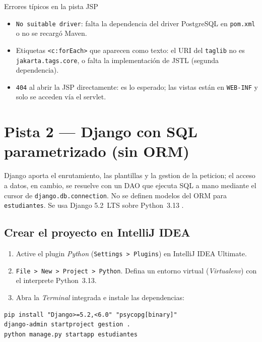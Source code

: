 \documentclass[11pt,a4paper,openany]{book}
\begin{document}
\begin{cajaadvertencia}{Errores típicos en la pista JSP}
\begin{itemize}
\item \texttt{No suitable driver}: falta la dependencia del driver
PostgreSQL en \texttt{pom.xml} o no se recargó Maven.
\item Etiquetas \texttt{<c:forEach>} que aparecen como texto: el URI del
\texttt{taglib} no es \texttt{jakarta.tags.core}, o falta la
implementación de JSTL (segunda dependencia).
\item \texttt{404} al abrir la JSP directamente: es lo esperado; las
vistas están en \texttt{WEB-INF} y solo se acceden vía el servlet.
\end{itemize}
\end{cajaadvertencia}

\section{Pista 2 --- Django con SQL parametrizado (sin ORM)}
\label{ap:crud:django}

Django aporta el enrutamiento, las plantillas y la gestion de la
peticion; el acceso a datos, en cambio, se resuelve con un DAO que
ejecuta SQL a mano mediante el cursor de \texttt{django.db.connection}.
No se definen modelos del ORM para \texttt{estudiantes}. Se usa Django
5.2~LTS sobre Python~3.13 \cite{django52docs}.

\subsection{Crear el proyecto en IntelliJ IDEA}
\label{ap:crud:django:crear}

\begin{enumerate}
\item Active el plugin \emph{Python} (\texttt{Settings > Plugins}) en
IntelliJ IDEA Ultimate.
\item \texttt{File > New > Project > Python}. Defina un entorno virtual
(\emph{Virtualenv}) con el interprete Python~3.13.
\item Abra la \emph{Terminal} integrada e instale las dependencias:
\end{enumerate}

\begin{lstlisting}[style=shell,caption={Instalacion de Django y el adaptador de PostgreSQL},label={lst:dj-pip}]
pip install "Django>=5.2,<6.0" "psycopg[binary]"
django-admin startproject gestion .
python manage.py startapp estudiantes
\end{lstlisting}
\end{document}
